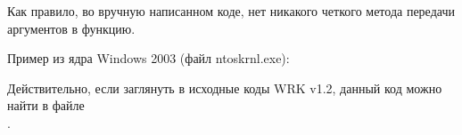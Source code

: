\par
Как правило, во вручную написанном коде, нет никакого четкого метода передачи аргументов в функцию.

\par
Пример из ядра Windows 2003 
(файл ntoskrnl.exe):



Действительно, если заглянуть в исходные коды 
\ac{WRK} v1.2, данный код можно найти в файле \\
.
